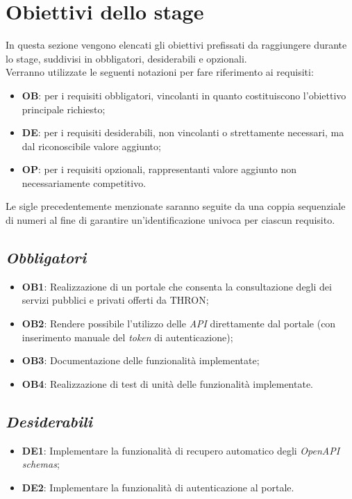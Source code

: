 \section{Obiettivi dello stage}\label{sec:obiettivi-stage}
In questa sezione vengono elencati gli obiettivi prefissati da raggiungere durante lo stage, suddivisi in obbligatori, desiderabili e opzionali.\\
Verranno utilizzate le seguenti notazioni per fare riferimento ai requisiti:
\begin{itemize}
    \item \textbf{OB}: per i requisiti obbligatori, vincolanti in quanto costituiscono l'obiettivo principale richiesto;
    \item \textbf{DE}: per i requisiti desiderabili, non vincolanti o strettamente necessari, ma dal riconoscibile valore aggiunto;
    \item \textbf{OP}: per i requisiti opzionali, rappresentanti valore aggiunto non necessariamente competitivo.
\end{itemize}
Le sigle precedentemente menzionate saranno seguite da una coppia sequenziale di numeri al fine di garantire un'identificazione univoca per ciascun requisito.

\subsection*{\emph{Obbligatori}}\label{subsec:obiettivi-obbligatori}
\begin{itemize}
    \item \textbf{OB1}: Realizzazione di un portale che consenta la consultazione degli  dei servizi pubblici e privati offerti da THRON;
    \item \textbf{OB2}: Rendere possibile l'utilizzo delle \textit{API} direttamente dal portale (con inserimento manuale del \textit{token} di autenticazione);
    \item \textbf{OB3}: Documentazione delle funzionalità implementate;
    \item \textbf{OB4}: Realizzazione di test di unità delle funzionalità implementate.
\end{itemize}

\subsection*{\emph{Desiderabili}}\label{subsec:obiettivi-desiderabili}
\begin{itemize}
    \item \textbf{DE1}: Implementare la funzionalità di recupero automatico degli \textit{OpenAPI schemas};
    \item \textbf{DE2}: Implementare la funzionalità di autenticazione al portale.
\end{itemize}

